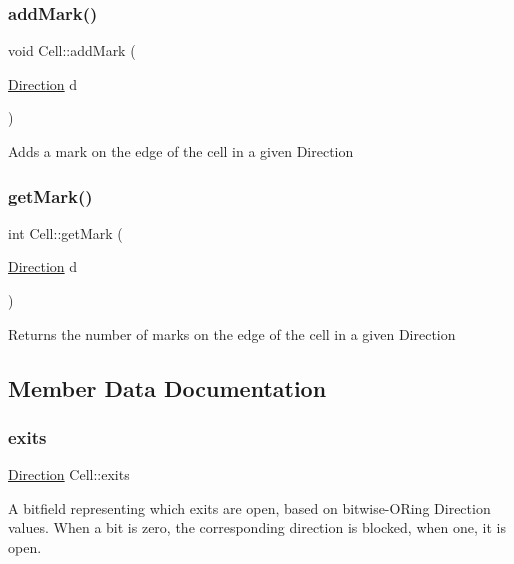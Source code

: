 \subsubsection{\texorpdfstring{add\+Mark()}{addMark()}}
{\footnotesize\ttfamily void Cell\+::add\+Mark (\begin{DoxyParamCaption}\item[{\hyperlink{util_8h_a92e22a126ad6bf9d255b517e70d083f6}{Direction}}]{d }\end{DoxyParamCaption})\hspace{0.3cm}{\ttfamily [inline]}}

Adds a mark on the edge of the cell in a given Direction \mbox{\label{structCell_abb4a89d3e0182cf87a3091e0b15d99de}} 
\subsubsection{\texorpdfstring{get\+Mark()}{getMark()}}
{\footnotesize\ttfamily int Cell\+::get\+Mark (\begin{DoxyParamCaption}\item[{\hyperlink{util_8h_a92e22a126ad6bf9d255b517e70d083f6}{Direction}}]{d }\end{DoxyParamCaption})\hspace{0.3cm}{\ttfamily [inline]}}

Returns the number of marks on the edge of the cell in a given Direction 

\subsection{Member Data Documentation}
\mbox{\label{structCell_a91285699009e9fb89724dc7302d7e9e0}} 
\subsubsection{\texorpdfstring{exits}{exits}}
{\footnotesize\ttfamily \hyperlink{util_8h_a92e22a126ad6bf9d255b517e70d083f6}{Direction} Cell\+::exits}

A bitfield representing which exits are open, based on bitwise-\/\+O\+Ring Direction values. When a bit is zero, the corresponding direction is blocked, when one, it is open. \mbox{\label{structCell_aa3a41503f8935cdb70adfb2d35fa7923}} 
